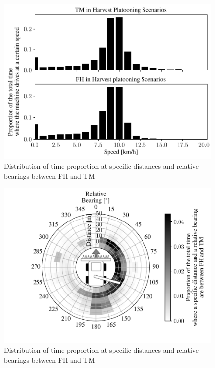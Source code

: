 \documentclass[]{nsm-thesis}
\begin{document}
\begin{figure}%
	\centering
	\includegraphics[width=0.99\textwidth]{figures/speedHarvestScenario.pdf}
	\caption{Distribution of time proportion at specific distances and relative bearings between \ac{FH} and \ac{TM}}%
	\label{fig:speed}%
\end{figure}


\begin{figure}%
	\centering
	\includegraphics[width=0.99\textwidth]{figures/bearingHarvestScenario.pdf}
	\caption{Distribution of time proportion at specific distances and relative bearings between \ac{FH} and \ac{TM}}%
	\label{fig:bearing}%
\end{figure}
\end{document}
